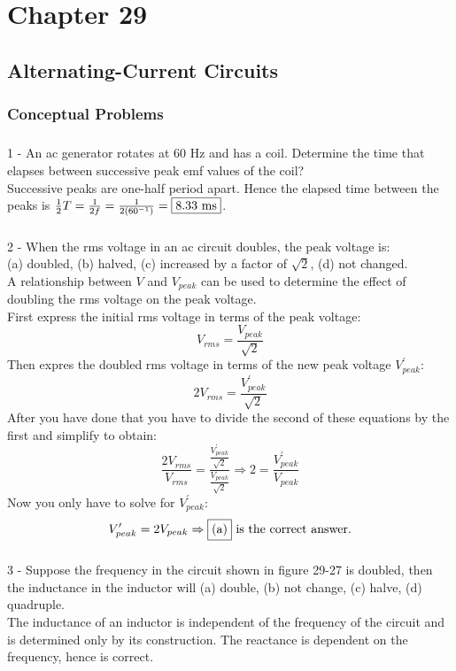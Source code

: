 \documentclass{report}
\begin{document}
\chapter{Chapter 29}

\section{Alternating-Current Circuits}
\subsection{Conceptual Problems}

\paragraph{}
1 - An ac generator rotates at 60 Hz and has a coil. Determine the time that elapses between successive peak emf values of the coil?\\
Successive peaks are one-half period apart. Hence the elapsed time between the peaks is $\frac{1}{2}T = \frac{1}{2f} = \frac{1}{2(60^{-1})} = \fbox{8.33 ms} $.

\paragraph{}
2 - When the rms voltage in an ac circuit doubles, the peak voltage is:\\
(a) doubled, (b) halved, (c) increased by a factor of $\sqrt{2}$, (d) not changed.\\
A relationship between $V$ and $V_{peak}$ can be used to determine the effect of doubling the rms voltage on the peak voltage.\\
First express the initial rms voltage in terms of the peak voltage:
$$V_{rms} = \frac{V_{peak}}{\sqrt{2}}$$
Then expres the doubled rms voltage in terms of the new peak voltage $V_{peak}^\prime$:
$$2V_{rms} = \frac{V_{peak}^\prime}{\sqrt{2}}$$
After you have done that you have to divide the second of these equations by the first and simplify to obtain:
$$\frac{2V_{rms}}{V_{rms}} = \frac{\frac{V_{peak}^\prime}{\sqrt{2}}}{\frac{V_{peak}}{\sqrt{2}}} \Rightarrow 2 = \frac{V_{peak}^\prime}{V_{peak}}$$
Now you only have to solve for $V_{peak}^\prime$:
$$V_{peak}^\prime = 2 V_{peak} \Rightarrow \fbox{(a)} \text{ is the correct answer.}$$
\paragraph{}
3 - Suppose the frequency in the circuit shown in figure 29-27 is doubled, then the inductance in the inductor will (a) double, (b) not change, (c) halve, (d) quadruple.\\
The inductance of an inductor is independent of the frequency of the circuit and is determined only by its construction. The reactance is dependent on the frequency, hence  is correct.
\end{document}

